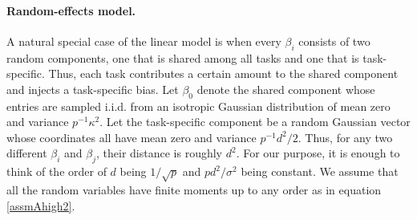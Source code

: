 \paragraph{Random-effects model.}
A natural special case of the linear model is when every $\beta_i$ consists of two random components, one that is shared among all tasks and one that is task-specific.
Thus, each task contributes a certain amount to the shared component and injects a task-specific bias.
Let $\beta_0$ denote the shared component whose entries are sampled i.i.d. from an isotropic Gaussian distribution of mean zero and variance $p^{-1}\kappa^2$.
Let the task-specific component be a random Gaussian vector whose coordinates all have mean zero and variance $p^{-1} d^2 / 2$.
Thus, for any two different $\beta_i$ and $\beta_j$, their distance is roughly $d^2$.
For our purpose, it is enough to think of the order of $d$ being $1/\sqrt{p}$ and $pd^2/\sigma^2$ being constant.
We assume that all the random variables have finite moments up to any order as in equation \eqref{assmAhigh2}.

